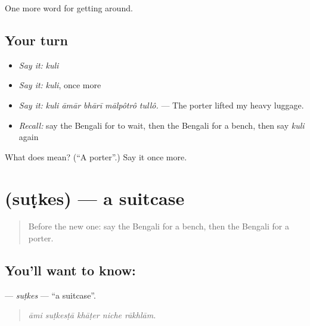 \begin{grammarlens}[title={What you've built}]
One more word for getting around.
\end{grammarlens}

\subsection*{Your turn}
\begin{itemize}
\raggedright
  \item \emph{Say it:} \emph{kuli}
  \item \emph{Say it:} \emph{kuli}, once more
  \item \emph{Say it:} \emph{kuli āmār bhārī mālpôtrô tullô.} — The porter lifted my heavy luggage.
  \item \emph{Recall:} say the Bengali for to wait, then the Bengali for a bench, then say \emph{kuli} again
\end{itemize}

\begin{tcolorbox}[breakable,colback=teal!4,colframe=teal!35!black,title={Before you move on}]
What does  mean? (\textquotedblleft{}A porter\textquotedblright{}.) Say it once more.
\end{tcolorbox}
\section[\texorpdfstring{\bn{সুটকেস} (suṭkes)}{সুটকেস (suṭkes)}]{ (suṭkes) — a suitcase}

\label{lesson:BN-C386-sutkes}



\begin{quote}
Before the new one: say the Bengali for a bench, then the Bengali for a porter.
\end{quote}

\subsection*{You'll want to know: }
\textbf{} — \emph{suṭkes} — \textquotedblleft{}a suitcase\textquotedblright{}.

\begin{quote}
    
\end{quote}

\begin{quote}
\emph{āmi suṭkesṭā khāṭer niche rākhlām.}
\end{quote}

